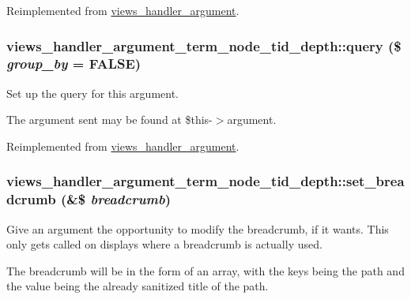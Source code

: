 Reimplemented from \hyperlink{classviews__handler__argument_a44f015a0d527983ae6df2689f66b2c24}{views\_\-handler\_\-argument}.\hypertarget{classviews__handler__argument__term__node__tid__depth_a0e537f160d9c8da21a844133ded89672}{
\subsubsection[{query}]{\setlength{\rightskip}{0pt plus 5cm}views\_\-handler\_\-argument\_\-term\_\-node\_\-tid\_\-depth::query (\$ {\em group\_\-by} = {\ttfamily FALSE})}}
\label{classviews__handler__argument__term__node__tid__depth_a0e537f160d9c8da21a844133ded89672}
Set up the query for this argument.

The argument sent may be found at \$this-\/$>$argument. 

Reimplemented from \hyperlink{classviews__handler__argument_af9ddabf5d386782c8ffc5785b7ae4263}{views\_\-handler\_\-argument}.\hypertarget{classviews__handler__argument__term__node__tid__depth_a4cbf578a06b12655b9a5aa8fcee4097d}{
\subsubsection[{set\_\-breadcrumb}]{\setlength{\rightskip}{0pt plus 5cm}views\_\-handler\_\-argument\_\-term\_\-node\_\-tid\_\-depth::set\_\-breadcrumb (\&\$ {\em breadcrumb})}}
\label{classviews__handler__argument__term__node__tid__depth_a4cbf578a06b12655b9a5aa8fcee4097d}
Give an argument the opportunity to modify the breadcrumb, if it wants. This only gets called on displays where a breadcrumb is actually used.

The breadcrumb will be in the form of an array, with the keys being the path and the value being the already sanitized title of the path. 

